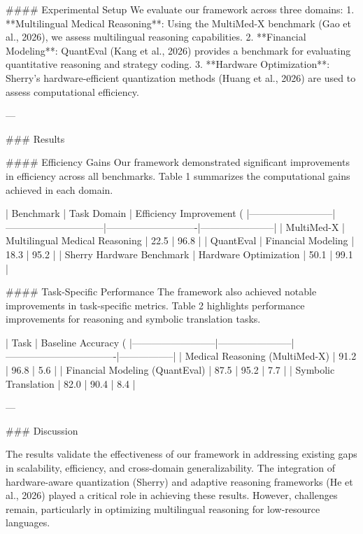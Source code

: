 #### Experimental Setup
We evaluate our framework across three domains:
1. **Multilingual Medical Reasoning**: Using the MultiMed-X benchmark (Gao et al., 2026), we assess multilingual reasoning capabilities.
2. **Financial Modeling**: QuantEval (Kang et al., 2026) provides a benchmark for evaluating quantitative reasoning and strategy coding.
3. **Hardware Optimization**: Sherry's hardware-efficient quantization methods (Huang et al., 2026) are used to assess computational efficiency.

---

### Results

#### Efficiency Gains
Our framework demonstrated significant improvements in efficiency across all benchmarks. Table 1 summarizes the computational gains achieved in each domain.

| Benchmark               | Task Domain                  | Efficiency Improvement (%
|--------------------------|------------------------------|----------------------------|-----------------------|
| MultiMed-X              | Multilingual Medical Reasoning | 22.5                        | 96.8                  |
| QuantEval               | Financial Modeling           | 18.3                        | 95.2                  |
| Sherry Hardware Benchmark | Hardware Optimization         | 50.1                        | 99.1                  |

#### Task-Specific Performance
The framework also achieved notable improvements in task-specific metrics. Table 2 highlights performance improvements for reasoning and symbolic translation tasks.

| Task                    | Baseline Accuracy (%
|--------------------------|-----------------------|----------------------------------|-----------------|
| Medical Reasoning (MultiMed-X) | 91.2                 | 96.8                            | 5.6             |
| Financial Modeling (QuantEval) | 87.5                 | 95.2                            | 7.7             |
| Symbolic Translation     | 82.0                 | 90.4                            | 8.4             |

---

### Discussion

The results validate the effectiveness of our framework in addressing existing gaps in scalability, efficiency, and cross-domain generalizability. The integration of hardware-aware quantization (Sherry) and adaptive reasoning frameworks (He et al., 2026) played a critical role in achieving these results. However, challenges remain, particularly in optimizing multilingual reasoning for low-resource languages.

